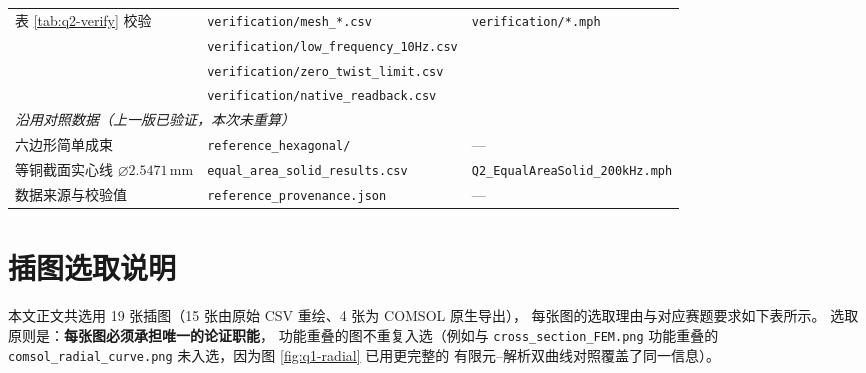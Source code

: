 \documentclass[12pt, a4paper]{ctexart}
\newcommand{\U}[1]{\ensuremath{\,\mathrm{#1}}}
\begin{document}
\begin{table}[H]
\begin{adjustbox}{max width=\textwidth}
\begin{tabular}{l l l}
表 \ref{tab:q2-verify} 校验 & \texttt{verification/mesh\_*.csv} & \texttt{verification/*.mph} \\
 & \texttt{verification/low\_frequency\_10Hz.csv} & \\
 & \texttt{verification/zero\_twist\_limit.csv} & \\
 & \texttt{verification/native\_readback.csv} & \\
\midrule
\multicolumn{3}{l}{\textit{沿用对照数据（上一版已验证，本次未重算）}} \\
六边形简单成束 & \texttt{reference\_hexagonal/} & --- \\
等铜截面实心线 $\varnothing 2.5471\U{mm}$ & \texttt{equal\_area\_solid\_results.csv} & \texttt{Q2\_EqualAreaSolid\_200kHz.mph} \\
数据来源与校验值 & \texttt{reference\_provenance.json} & --- \\
\bottomrule
\end{tabular}
\end{adjustbox}
\end{table}

\section{插图选取说明}

本文正文共选用 19 张插图（15 张由原始 CSV 重绘、4 张为 COMSOL 原生导出），
每张图的选取理由与对应赛题要求如下表所示。
选取原则是：\textbf{每张图必须承担唯一的论证职能}，
功能重叠的图不重复入选（例如与 \texttt{cross\_section\_FEM.png} 功能重叠的
\texttt{comsol\_radial\_curve.png} 未入选，因为图 \ref{fig:q1-radial} 已用更完整的
有限元–解析双曲线对照覆盖了同一信息）。
\end{document}

